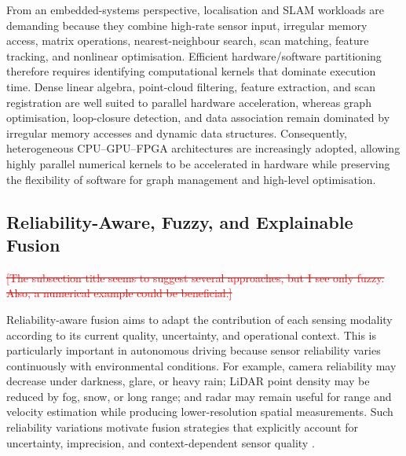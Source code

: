 \documentclass{ieeeaccess}
\newcommand{\deleted}[1]{\textcolor{red}{\sout{#1}}}
\begin{document}
From an embedded-systems perspective, localisation and SLAM workloads are demanding because they combine high-rate sensor input, irregular memory access, matrix operations, nearest-neighbour search, scan matching, feature tracking, and nonlinear optimisation. Efficient hardware/software partitioning therefore requires identifying computational kernels that dominate execution time. Dense linear algebra, point-cloud filtering, feature extraction, and scan registration are well suited to parallel hardware acceleration, whereas graph optimisation, loop-closure detection, and data association remain dominated by irregular memory accesses and dynamic data structures. Consequently, heterogeneous CPU--GPU--FPGA architectures are increasingly adopted, allowing highly parallel numerical kernels to be accelerated in hardware while preserving the flexibility of software for graph management and high-level optimisation.

\subsection{Reliability-Aware, Fuzzy, and Explainable Fusion}

\deleted{[The subsection title seems to suggest several approaches, but I see only fuzzy. Also, a numerical example could be beneficial.]} %


Reliability-aware fusion aims to adapt the contribution of each sensing modality according to its current quality, uncertainty, and operational context. This is particularly important in autonomous driving because sensor reliability varies continuously with environmental conditions. For example, camera reliability may decrease under darkness, glare, or heavy rain; LiDAR point density may be reduced by fog, snow, or long range; and radar may remain useful for range and velocity estimation while producing lower-resolution spatial measurements. Such reliability variations motivate fusion strategies that explicitly account for uncertainty, imprecision, and context-dependent sensor quality \cite{khaleghi_multisensor_2013, hall_introduction_1997}.
\end{document}
